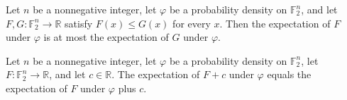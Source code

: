 \begin{theorem}
\label{FABL.ProbabilityDensity.expectation_mono}
\leanok
{}
Let $n$ be a nonnegative integer, let $\varphi$ be a probability density on $\mathbb
F_2^n$, and let $F,G:\mathbb F_2^n\to\mathbb R$ satisfy $F(x)\le G(x)$ for every $x$.
Then the expectation of $F$ under $\varphi$ is at most the expectation of $G$ under
$\varphi$.
\end{theorem}

\begin{theorem}
\label{FABL.ProbabilityDensity.expectation_add_const}
\leanok
{}
Let $n$ be a nonnegative integer, let $\varphi$ be a probability density on $\mathbb
F_2^n$, let $F:\mathbb F_2^n\to\mathbb R$, and let $c\in\mathbb R$. The expectation of
$F+c$ under $\varphi$ equals the expectation of $F$ under $\varphi$ plus $c$.
\end{theorem}

